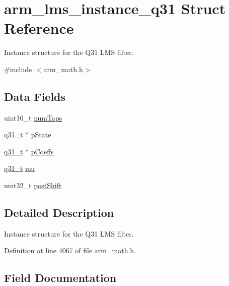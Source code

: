 \hypertarget{structarm__lms__instance__q31}{}\section{arm\+\_\+lms\+\_\+instance\+\_\+q31 Struct Reference}
\label{structarm__lms__instance__q31}


Instance structure for the Q31 L\+MS filter.  




{\ttfamily \#include $<$arm\+\_\+math.\+h$>$}

\subsection*{Data Fields}
\begin{DoxyCompactItemize}
\item 
uint16\+\_\+t \hyperlink{structarm__lms__instance__q31_a751941891e47f522a7f5375fe8990aac}{num\+Taps}
\item 
\hyperlink{arm__math_8h_adc89a3547f5324b7b3b95adec3806bc0}{q31\+\_\+t} $\ast$ \hyperlink{structarm__lms__instance__q31_adee4ba3ee8869865af7d8fa08ca913d6}{p\+State}
\item 
\hyperlink{arm__math_8h_adc89a3547f5324b7b3b95adec3806bc0}{q31\+\_\+t} $\ast$ \hyperlink{structarm__lms__instance__q31_a68888e36167d81cb7836db10367a1682}{p\+Coeffs}
\item 
\hyperlink{arm__math_8h_adc89a3547f5324b7b3b95adec3806bc0}{q31\+\_\+t} \hyperlink{structarm__lms__instance__q31_a21ab4237a726ea7751f5026d89d2e577}{mu}
\item 
uint32\+\_\+t \hyperlink{structarm__lms__instance__q31_aa2cacddfc5e1d86905d7d31a18b1979b}{post\+Shift}
\end{DoxyCompactItemize}


\subsection{Detailed Description}
Instance structure for the Q31 L\+MS filter. 

Definition at line 4067 of file arm\+\_\+math.\+h.



\subsection{Field Documentation}
